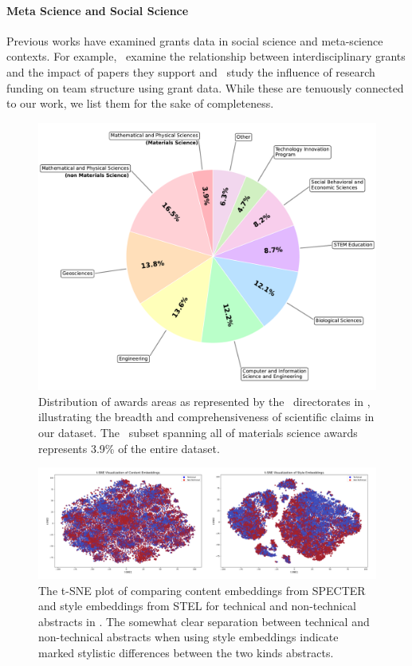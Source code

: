 \documentclass[11pt]{article}
\begin{document}
\paragraph{Meta Science and Social Science} Previous works have examined grants data in social science and meta-science contexts. For example,~\citet{park2024} examine the relationship between interdisciplinary grants and the impact of papers they support and~\citet{xu2022} study the influence of research funding on team structure using grant data. While these are tenuously connected to our work, we list them for the sake of completeness.
\begin{figure}[t]
    \centering
    \includegraphics[width=1\linewidth]{images/directorate_distribution_with_materials.pdf}
    \caption{Distribution of awards areas as represented by the \NSF~directorates in \DatasetName, illustrating the breadth and comprehensiveness of scientific claims in our dataset. The \DatasetNameMatSci~subset spanning all of materials science awards represents 3.9\% of the entire dataset.}
    \label{fig:award-distribution}
\end{figure}
\begin{figure}[h!]
    \centering
    \includegraphics[width=1\linewidth]{images/tsne-specter-stel.png}
    \caption{The t-SNE plot of comparing content embeddings from SPECTER \cite{cohan-etal-2020-specter} and style embeddings from STEL \cite{patel2025} for technical and non-technical abstracts in \DatasetNameMatSci. The somewhat clear separation between technical and non-technical abstracts when using style embeddings indicate marked stylistic differences between the two kinds abstracts.}
    \label{fig:tsne-specter-stel}
\end{figure}
\end{document}
